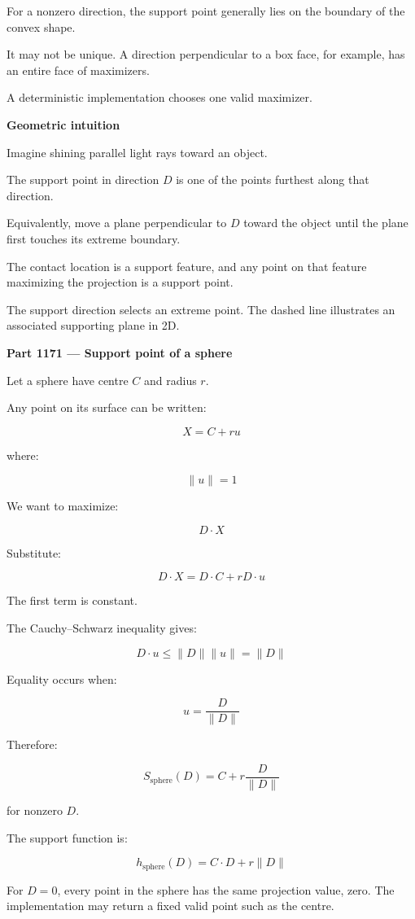 For a nonzero direction, the support point generally lies on the boundary of the convex shape.

It may not be unique. A direction perpendicular to a box face, for example, has an entire face of maximizers.

A deterministic implementation chooses one valid maximizer.

\textbf{Geometric intuition}

Imagine shining parallel light rays toward an object.

The support point in direction \(D\) is one of the points furthest along that direction.

Equivalently, move a plane perpendicular to \(D\) toward the object until the plane first touches its extreme boundary.

The contact location is a support feature, and any point on that feature maximizing the projection is a support point.

The support direction selects an extreme point. The dashed line illustrates an associated supporting plane in 2D.

\textbf{Part 1171 --- Support point of a sphere}

Let a sphere have centre \(C\) and radius \(r\).

Any point on its surface can be written:

\[
X=C+ru
\]

where:

\[
\|u\|=1
\]

We want to maximize:

\[
D\cdot X
\]

Substitute:

\[
D\cdot X=D\cdot C+rD\cdot u
\]

The first term is constant.

The Cauchy--Schwarz inequality gives:

\[
D\cdot u\le\|D\|\|u\|=\|D\|
\]

Equality occurs when:

\[
u=\frac{D}{\|D\|}
\]

Therefore:

\[
\boxed{ S_{\mathrm{sphere}}(D)= C+r\frac{D}{\|D\|} }
\]

for nonzero \(D\).

The support function is:

\[
\boxed{ h_{\mathrm{sphere}}(D)=C\cdot D+r\|D\| }
\]

For \(D=0\), every point in the sphere has the same projection value, zero. The implementation may return a fixed valid point such as the centre.

